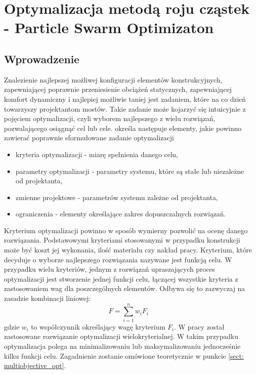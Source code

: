 \chapter{Optymalizacja metodą roju cząstek - Particle Swarm Optimizaton} \label{sect:PSO_chapter}
\section*{Wprowadzenie}
Znalezienie najlepszej możliwej konfiguracji elementów konstrukcyjnych, zapewniającej poprawnie przeniesienie obciążeń statycznych, zapewniającej komfort dynamiczny i najlepiej możliwie taniej jest zadaniem, które na co dzień towarzyszy projektantom mostów. Takie zadanie może kojarzyć się intuicyjnie z pojęciem optymalizacji, czyli wyborem najlepszego z wielu rozwiązań, pozwalającego osiągnąć cel lub cele. \cite{Szymczak1995} określa następuje elementy, jakie powinno zawierać poprawnie sformułowane zadanie optymalizacji
\begin{itemize}[noitemsep]
	\item kryteria optymalizacji - miarę spełnienia danego celu,
	\item parametry optymalizacji - parametry systemu, które są stałe lub niezależne od projektanta, 
	\item zmienne projektowe - parametrów systemu zależne od projektanta,
	\item ograniczenia - elementy określające zakres dopuszczalnych rozwiązań. 
\end{itemize}
Kryterium optymalizacji powinno w sposób wymierny pozwolić na ocenę danego rozwiązania. Podstawowymi kryteriami stosowanymi w przypadku konstrukcji może być koszt jej wykonania, ilość materiału czy nakład pracy. Kryterium, które decyduje o wyborze najlepszego rozwiązania nazywane jest funkcją celu. W przypadku wielu kryteriów, jednym z rozwiązań upraszających proces optymalizacji jest stworzenie jednej funkcji celu, łączącej wszystkie kryteria z zastosowaniem wag dla poszczególnych elementów. Odbywa się to zazwyczaj na zasadzie kombinacji liniowej:
\begin{equation}
	F=\sum_{i=1}^{n}w_i F_i
\end{equation}
gdzie $w_i$ to współczynnik określający wagę kryterium $F_i$. W pracy został zastosowane rozwiązanie optymalizacji wielokryterialnej. W takim przypadku optymalizacja polega na minimalizowaniu lub maksymalizowaniu jednocześnie kilku funkcji celu. Zagadnienie zostanie omówione teoretycznie w punkcie \ref{sect: multiobjective_opt}. 

